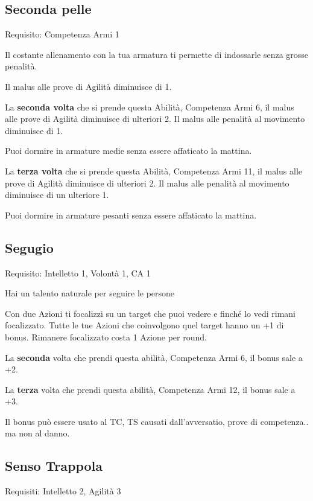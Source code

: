 \documentclass[a4paper,11pt,twoside,openany]{book}
\begin{document}
\subsection{Seconda pelle}

Requisito: Competenza Armi 1

Il costante allenamento con la tua armatura ti permette di indossarle senza grosse penalità.

Il malus alle prove di Agilità diminuisce di 1.

La \textbf{seconda volta} che si prende questa Abilità, Competenza Armi 6, il malus alle prove di Agilità diminuisce di ulteriori 2.
Il malus alle penalità al movimento diminuisce di 1.

Puoi dormire in armature medie senza essere affaticato la mattina.

La \textbf{terza volta} che si prende questa Abilità, Competenza Armi 11, il malus alle prove di Agilità diminuisce di ulteriori 2. Il malus alle penalità al movimento diminuisce di un ulteriore 1.

Puoi dormire in armature pesanti senza essere affaticato la mattina.

\subsection{Segugio}

Requisito: Intelletto 1, Volontà 1, CA 1

Hai un talento naturale per seguire le persone

Con due Azioni ti focalizzi su un target che puoi vedere e finché lo vedi rimani focalizzato. Tutte le tue Azioni che coinvolgono quel target hanno un +1 di bonus. Rimanere focalizzato costa 1 Azione per round.

La \textbf{seconda} volta che prendi questa abilità, Competenza Armi 6, il bonus sale a +2.

La \textbf{terza} volta che prendi questa abilità, Competenza Armi 12, il bonus sale a +3.

Il bonus può essere usato al TC, TS causati dall'avversatio, prove di competenza.. ma non al danno.

\subsection{Senso Trappola}

Requisiti: Intelletto 2, Agilità 3
\end{document}
